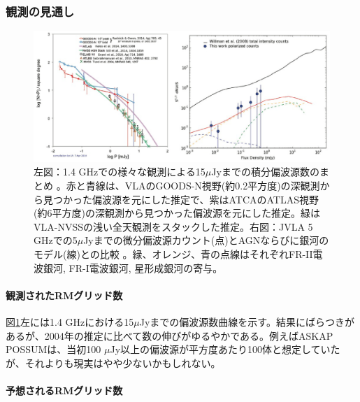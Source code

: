 \subsubsection{観測の見通し}
\label{c06.s2.ss1.sss2}

\begin{figure}[tbp]
\begin{center}
\includegraphics[width=0.95\linewidth]{magnetism/c06.s2.ss1.f1.eps}
\end{center}
\caption{左図：1.4 GHzでの様々な観測による15$\mu$Jyまでの積分偏波源数のまとめ \citep{Rudnick_private}。赤と青線は、VLAのGOODS-N視野(約0.2平方度)の深観測から見つかった偏波源を元にした推定\citep{2014ApJ...785...45R}で、紫はATCAのATLAS視野(約6平方度)の深観測から見つかった偏波源を元にした推定\citep{2014MNRAS.440.3113H}。緑はVLA-NVSSの浅い全天観測をスタックした推定\citep{2014ApJ...787...99S}。右図：JVLA 5 GHzでの5$\mu$Jyまでの微分偏波源カウント(点)とAGNならびに銀河のモデル(線)との比較 \citep{1405.0117}。緑、オレンジ、青の点線はそれぞれFR-II電波銀河, FR-I電波銀河, 星形成銀河の寄与。
}\label{c06.s2.ss1.f1}
\end{figure}

\paragraph{観測されたRMグリッド数}

図\ref{c06.s2.ss1.f1}左には1.4 GHzにおける15$\mu$Jyまでの偏波源数曲線を示す。結果にばらつきがあるが、2004年の推定に比べて数の伸びがゆるやかである。例えばASKAP POSSUMは、当初100 $\mu$Jy以上の偏波源が平方度あたり100体と想定していたが、それよりも現実はやや少ないかもしれない。

\paragraph{予想されるRMグリッド数}

